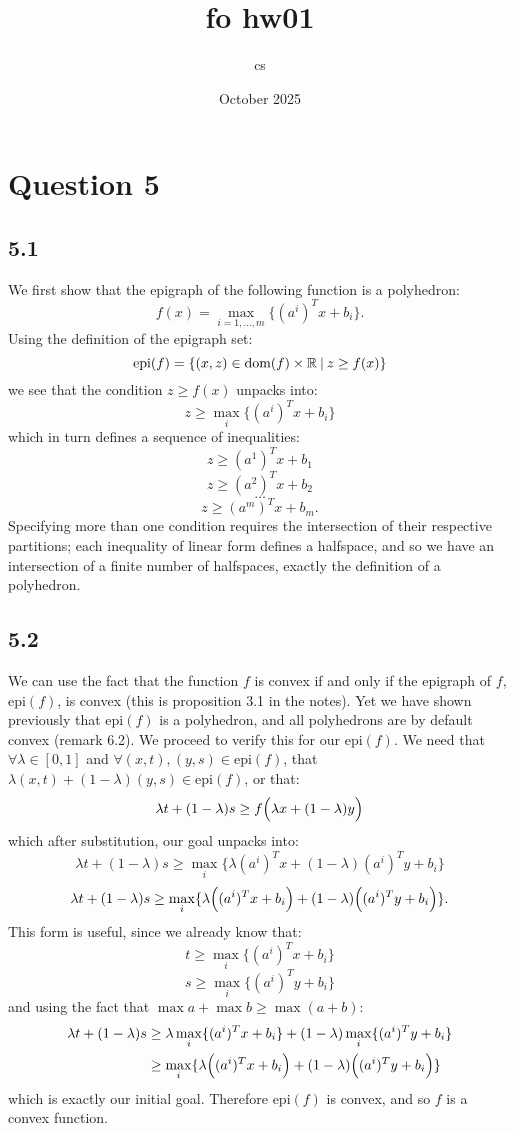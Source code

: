 \documentclass{article}
\title{fo hw01}
\author{cs}
\date{October 2025}
\begin{document}
\maketitle

\section{Question 5}

\subsection{5.1}
We first show that the epigraph of the following function is a polyhedron:
$$f(x)=\max_{i=1,\dots,m}\{(a^i)^T x+b_i\}.$$
Using the definition of the epigraph set:
$$\text{epi}(f)
=\{(x,z)\in\text{dom}(f)\times
\mathbb{R}\hspace{0.03in}|\hspace{0.03in}z\geq f(x)\}$$
we see that the condition $z\geq f(x)$ unpacks into:
$$z\geq\max_i\{(a^i)^T x+b_i\}$$
which in turn defines a sequence of inequalities:
$$z\geq(a^1)^T x+b_1$$
$$z\geq(a^2)^T x+b_2$$
$$\dots$$
$$z\geq(a^m)^T x+b_m.$$
Specifying more than one condition requires the intersection of their respective
partitions; each inequality of linear form defines a halfspace, and so we have
an intersection of a finite number of halfspaces, exactly the definition of a
polyhedron.

\subsection{5.2}
We can use the fact that the function $f$ is convex if and only if the epigraph
of $f$, $\text{epi}(f)$, is convex (this is proposition 3.1 in the notes). Yet
we have shown previously that $\text{epi}(f)$ is a polyhedron, and all 
polyhedrons are by default convex (remark 6.2). We proceed to verify this for
our
$\text{epi}(f)$. We need that $\forall\lambda\in[0,1]$ and
$\forall (x,t),(y,s)\in\text{epi}(f)$, that
$\lambda(x,t)+(1-\lambda)(y,s)\in\text{epi}(f)$, or that:
$$\lambda t+(1-\lambda)s\geq f\Bigl(\lambda x+(1-\lambda)y\Bigr)$$
which after substitution, our goal unpacks into:
$$\lambda t+(1-\lambda)s\geq
\max_i\{\lambda(a^i)^T x+(1-\lambda)(a^i)^T y+b_i\}$$
$$\lambda t+(1-\lambda)s\geq
\max_i\{\lambda\Bigl((a^i)^T x+b_i\Bigr)+
(1-\lambda)\Bigl((a^i)^T y+b_i\Bigr)\}.$$
This form is useful, since we already know that:
$$t\geq\max_i\{(a^i)^T x+b_i\}$$
$$s\geq\max_i\{(a^i)^T y+b_i\}$$
and using the fact that $\max{a}+\max{b}\geq\max{(a+b)}$:
\begin{align*}
    \lambda t+(1-\lambda)s
    &\geq\lambda\max_i\{(a^i)^T x+b_i\}+(1-\lambda)\max_i\{(a^i)^T y+b_i\} \\
    &\geq\max_i\{\lambda\Bigl((a^i)^T x+b_i\Bigr)+
    (1-\lambda)\Bigl((a^i)^T y+b_i\Bigr)\}
\end{align*}
which is exactly our initial goal. Therefore $\text{epi}(f)$ is convex, and so
$f$ is a convex function.
\end{document}
